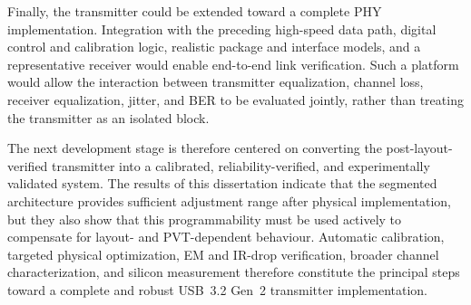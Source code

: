 Finally, the transmitter could be extended toward a complete \ac{PHY} implementation. Integration with the preceding high-speed data path, digital control and calibration logic, realistic package and interface models, and a representative receiver would enable end-to-end link verification. Such a platform would allow the interaction between transmitter equalization, channel loss, receiver equalization, jitter, and \ac{BER} to be evaluated jointly, rather than treating the transmitter as an isolated block.

The next development stage is therefore centered on converting the post-layout-verified transmitter into a calibrated, reliability-verified, and experimentally validated system. The results of this dissertation indicate that the segmented architecture provides sufficient adjustment range after physical implementation, but they also show that this programmability must be used actively to compensate for layout- and \ac{PVT}-dependent behaviour. Automatic calibration, targeted physical optimization, \ac{EM} and IR-drop verification, broader channel characterization, and silicon measurement therefore constitute the principal steps toward a complete and robust \ac{USB}~3.2 Gen~2 transmitter implementation.

